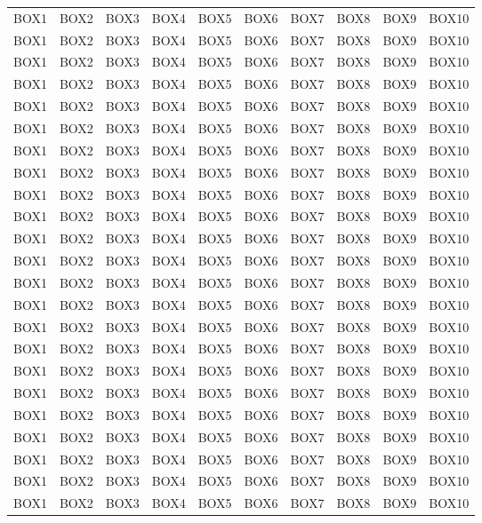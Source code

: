\begin{landscape}
\begin{longtable}[c]{c|c|c|c|c|c|c|c|c|c}
	BOX1 & BOX2 & BOX3 & BOX4 & BOX5 & BOX6 & BOX7 & BOX8 & BOX9 & BOX10 \\
	BOX1 & BOX2 & BOX3 & BOX4 & BOX5 & BOX6 & BOX7 & BOX8 & BOX9 & BOX10 \\
	BOX1 & BOX2 & BOX3 & BOX4 & BOX5 & BOX6 & BOX7 & BOX8 & BOX9 & BOX10 \\
	BOX1 & BOX2 & BOX3 & BOX4 & BOX5 & BOX6 &	BOX7 & BOX8 & BOX9 & BOX10 \\
	BOX1 & BOX2 & BOX3 & BOX4 & BOX5 & BOX6 &	BOX7 & BOX8 & BOX9 & BOX10 \\
	BOX1 & BOX2 & BOX3 & BOX4 & BOX5 & BOX6 &	BOX7 & BOX8 & BOX9 & BOX10 \\
	BOX1 & BOX2 & BOX3 & BOX4 & BOX5 & BOX6 &	BOX7 & BOX8 & BOX9 & BOX10 \\
	BOX1 & BOX2 & BOX3 & BOX4 & BOX5 & BOX6 &	BOX7 & BOX8 & BOX9 & BOX10 \\
	BOX1 & BOX2 & BOX3 & BOX4 & BOX5 & BOX6 &	BOX7 & BOX8 & BOX9 & BOX10 \\
	BOX1 & BOX2 & BOX3 & BOX4 & BOX5 & BOX6 &	BOX7 & BOX8 & BOX9 & BOX10 \\
	BOX1 & BOX2 & BOX3 & BOX4 & BOX5 & BOX6 & BOX7 & BOX8 & BOX9 & BOX10 \\
	BOX1 & BOX2 & BOX3 & BOX4 & BOX5 & BOX6 &	BOX7 & BOX8 & BOX9 & BOX10 \\
	BOX1 & BOX2 & BOX3 & BOX4 & BOX5 & BOX6 &	BOX7 & BOX8 & BOX9 & BOX10 \\
	BOX1 & BOX2 & BOX3 & BOX4 & BOX5 & BOX6 &	BOX7 & BOX8 & BOX9 & BOX10 \\
	BOX1 & BOX2 & BOX3 & BOX4 & BOX5 & BOX6 &	BOX7 & BOX8 & BOX9 & BOX10 \\
	BOX1 & BOX2 & BOX3 & BOX4 & BOX5 & BOX6 &	BOX7 & BOX8 & BOX9 & BOX10 \\
	BOX1 & BOX2 & BOX3 & BOX4 & BOX5 & BOX6 &	BOX7 & BOX8 & BOX9 & BOX10 \\
	BOX1 & BOX2 & BOX3 & BOX4 & BOX5 & BOX6 &	BOX7 & BOX8 & BOX9 & BOX10 \\
	BOX1 & BOX2 & BOX3 & BOX4 & BOX5 & BOX6 &	BOX7 & BOX8 & BOX9 & BOX10 \\                                 
	BOX1 & BOX2 & BOX3 & BOX4 & BOX5 & BOX6 &	BOX7 & BOX8 & BOX9 & BOX10 \\
	BOX1 & BOX2 & BOX3 & BOX4 & BOX5 & BOX6 &	BOX7 & BOX8 & BOX9 & BOX10 \\
	BOX1 & BOX2 & BOX3 & BOX4 & BOX5 & BOX6 &	BOX7 & BOX8 & BOX9 & BOX10 \\
	BOX1 & BOX2 & BOX3 & BOX4 & BOX5 & BOX6 &	BOX7 & BOX8 & BOX9 & BOX10 \\

\end{longtable}
\end{landscape}
